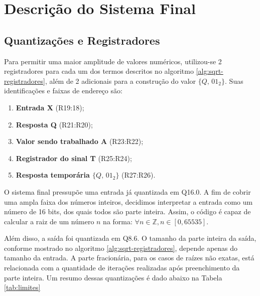 \documentclass[conference]{IEEEtran}
\begin{document}
\section{Descrição do Sistema Final}
\subsection{Quantizações e Registradores}
Para permitir uma maior amplitude de valores numéricos, utilizou-se 2 registradores para cada um dos termos descritos no algoritmo \ref{alg:sqrt-registradores}, além de 2 adicionais para a construção do valor $\{Q,\,01_2\}$. Suas identificações e faixas de endereço são:
\begin{enumerate}
    \item \textbf{Entrada X}  (R19:18);
    
    \item \textbf{Resposta Q} (R21:R20);
    
    \item \textbf{Valor sendo trabalhado A} (R23:R22);
 
    \item \textbf{Registrador do sinal T} (R25:R24);

    \item \textbf{Resposta temporária $\{Q,\,01_2\}$} (R27:R26).

\end{enumerate}

O sistema final pressupõe uma entrada já quantizada em Q16.0. A fim de cobrir uma ampla faixa dos números inteiros, decidimos interpretar a entrada como um número de 16 bits, dos quais todos são parte inteira. Assim, o código é capaz de calcular a raiz de um número $n$ na forma: $\forall n \in \mathbb{Z}, n \in [0, 65535]$. 

Além disso, a saída foi quantizada em Q8.6. O tamanho da parte inteira da saída, conforme mostrado no algoritmo \ref{alg:sqrt-registradores}, depende apenas do tamanho da entrada. A parte fracionária, para os casos de raízes não exatas, está relacionada com a quantidade de iterações realizadas após preenchimento da parte inteira. Um resumo dessas quantizações é dado abaixo na Tabela \ref{tab:limites}
\end{document}
